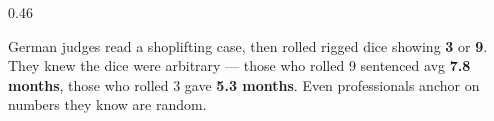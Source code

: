 \documentclass[aspectratio=169]{beamer}
\begin{document}
\begin{frame}
\begin{columns}[T]
\begin{column}{0.46\textwidth}
\begin{center}
\vspace{0.1cm}
{\scriptsize German judges read a shoplifting case, then rolled rigged dice showing \textbf{3} or \textbf{9}. They knew the dice were arbitrary --- those who rolled 9 sentenced avg \textbf{7.8 months}, those who rolled 3 gave \textbf{5.3 months}. \textcolor{warnred}{Even professionals anchor on numbers they know are random.}}
\end{center}
\end{column}
\end{columns}

\vspace{0.05cm}
\begin{center}
\end{center}
\end{frame}
\end{document}
